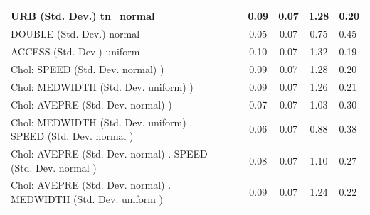 \begin{table}
\begin{center}
\begin{tabular}{|l|l|c|c|c|l|}
			\hline
			URB (Std. Dev.) tn_normal &  & 0.09 & 0.07 & 1.28 & 0.20 \\
			\hline
			DOUBLE (Std. Dev.) normal &  & 0.05 & 0.07 & 0.75 & 0.45 \\
			\hline
			ACCESS (Std. Dev.) uniform &  & 0.10 & 0.07 & 1.32 & 0.19 \\
			\hline
			 Chol: SPEED (Std. Dev. normal) ) &  & 0.09 & 0.07 & 1.28 & 0.20 \\
			\hline
			 Chol: MEDWIDTH (Std. Dev. uniform) ) &  & 0.09 & 0.07 & 1.26 & 0.21 \\
			\hline
			 Chol: AVEPRE (Std. Dev. normal) ) &  & 0.07 & 0.07 & 1.03 & 0.30 \\
			\hline
			 Chol: MEDWIDTH (Std. Dev. uniform) . SPEED (Std. Dev.   normal ) &  & 0.06 & 0.07 & 0.88 & 0.38 \\
			\hline
			 Chol: AVEPRE (Std. Dev. normal) . SPEED (Std. Dev.   normal ) &  & 0.08 & 0.07 & 1.10 & 0.27 \\
			\hline
			 Chol: AVEPRE (Std. Dev. normal) . MEDWIDTH (Std. Dev.   uniform ) &  & 0.09 & 0.07 & 1.24 & 0.22 \\
			\hline
		\end{tabular}
	\end{center}
\end{table}